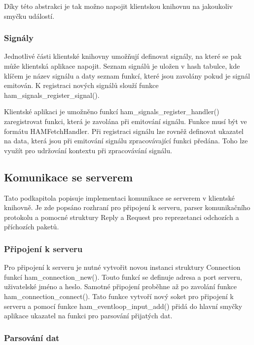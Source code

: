 Díky této abstrakci je tak možno napojit klientskou knihovnu na jakoukoliv smyčku událostí.

\subsubsection{Signály}

Jednotlivé části klientské knihovny umožňují definovat signály, na které se pak může klientská aplikace napojit.
Seznam signálů je uložen v hash tabulce, kde klíčem je název signálu a daty seznam funkcí, které jsou zavolány
pokud je signál emitován. K registraci nových signálů slouží funkce ham\_signals\_register\_signal().

Klientské aplikaci je umožněno funkcí ham\_signals\_register\_handler() zaregistrovat funkci, která je zavolána
při emitování signálu. Funkce musí být ve formátu HAMFetchHandler. Při registraci signálu lze rovněž definovat
ukazatel na data, která jsou při emitování signálu zpracovávající funkci předána. Toho lze využít pro udržování
kontextu při zpracovávání signálu.


\subsection{Komunikace se serverem}

Tato podkapitola popisuje implementaci komunikace se serverem v klientské knihovně. Je zde popsáno rozhraní pro
připojení k serveru, parser komunikačního protokolu a pomocné struktury Reply a Request pro reprezetanci odchozích a
příchozích paketů.

\subsubsection{Připojení k serveru}

Pro připojení k serveru je nutné vytvořit novou instanci struktury Connection funkcí ham\_connection\_new(). Touto funkcí
se definuje adresa a port serveru, uživatelské jméno a heslo. Samotné připojení proběhne až po zavolání funkce
ham\_connection\_connect(). Tato funkce vytvoří nový soket pro připojení k serveru a pomocí funkce ham\_eventloop\_input\_add()
přidá do hlavní smyčky aplikace ukazatel na funkci pro parsování přijatých dat.

\subsubsection{Parsování dat}

